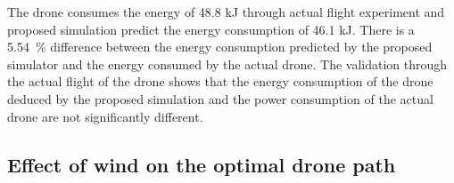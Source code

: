 \documentclass[journal]{./template/IEEEtran}
\begin{document}
The drone consumes the energy of 48.8 kJ through actual flight experiment and proposed simulation predict the energy consumption of 46.1 kJ.
There is a 5.54~\% difference between the energy consumption predicted by the proposed simulator and the energy consumed by the actual drone.
The validation through the actual flight of the drone shows that the energy consumption of the drone deduced by the proposed simulation and the power consumption of the actual drone are not significantly different.




\subsection{Effect of wind on the optimal drone path}

\end{document}
